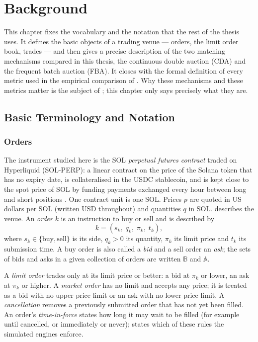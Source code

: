 \chapter{Background}
\label{ch:background}

This chapter fixes the vocabulary and the notation that the rest of the
thesis uses. It defines the basic objects of a trading venue --- orders,
the limit order book, trades --- and then gives a precise description of
the two matching mechanisms compared in this thesis, the continuous double
auction (CDA) and the frequent batch auction (FBA). It closes with the
formal definition of every metric used in the empirical comparison of
. Why these mechanisms and these metrics matter is the
subject of ; this chapter only says precisely what
they are.

\section{Basic Terminology and Notation}
\label{sec:terminology}

\subsection{Orders}

The instrument studied here is the SOL \emph{perpetual futures contract}
traded on Hyperliquid (SOL-PERP): a linear contract on the price of the
Solana token that has no expiry date, is collateralised in the USDC
stablecoin, and is kept close to the spot price of SOL by funding payments
exchanged every hour between long and short positions
\citep{hyperliquid2026docs}. One contract unit is one SOL. Prices $p$ are
quoted in US dollars per SOL (written USD throughout) and quantities $q$ in
SOL.  describes the venue. An \emph{order} $k$ is an
instruction to buy or sell and is described by
\begin{equation}
  k = (s_k,\; q_k,\; \pi_k,\; t_k),
\end{equation}
where $s_k \in \{\text{buy}, \text{sell}\}$ is its side, $q_k > 0$ its
quantity, $\pi_k$ its limit price and $t_k$ its submission time. A buy
order is also called a \emph{bid} and a sell order an \emph{ask}; the sets
of bids and asks in a given collection of orders are written $\mathbb{B}$
and $\mathbb{A}$.

A \emph{limit order} trades only at its limit price or better: a bid at
$\pi_k$ or lower, an ask at $\pi_k$ or higher. A \emph{market order} has no
limit and accepts any price; it is treated as a bid with no upper price
limit or an ask with no lower price limit. A \emph{cancellation} removes a
previously submitted order that has not yet been filled. An order's
\emph{time-in-force} states how long it may wait to be filled (for example
until cancelled, or immediately or never);  states
which of these rules the simulated engines enforce.

